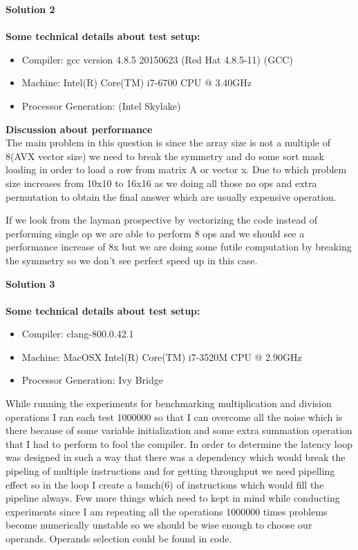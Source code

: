 \documentclass[letterpaper, 11pt]{article}
\begin{document}
\textbf{Solution 2}\\ \\
\textbf{Some technical details about test setup:}
\begin{itemize}
\item Compiler: gcc version 4.8.5 20150623 (Red Hat 4.8.5-11) (GCC) 
\item Machine:  Intel(R) Core(TM) i7-6700 CPU @ 3.40GHz
\item Processor Generation: (Intel Skylake)
\end{itemize}
\textbf{Discussion about performance}\\
The main problem in this question is since the array size is not a multiple of 8(AVX vector size) we need to break the symmetry and do some sort mask loading in order to load a row from matrix A or vector x. Due to which problem size increases from 10x10 to 16x16 as we doing all those no ops and extra permutation to obtain the final answer which are usually expensive operation.

If we look from the layman prospective by vectorizing the code instead of performing single op we are able to perform 8 ops and we should see a performance increase of 8x but we are doing some futile computation by breaking the symmetry so we don't see perfect speed up in this case.
\bigskip

\textbf{Solution 3}\\ \\
\textbf{Some technical details about test setup:} 
\begin{itemize}
\item Compiler: clang-800.0.42.1
\item Machine: MacOSX Intel(R) Core(TM) i7-3520M CPU @ 2.90GHz
\item Processor Generation: Ivy Bridge
\end{itemize}
While running the experiments for benchmarking multiplication and division operations I ran each test 1000000 so that I can overcome all the noise which is there because of some variable initialization and some extra summation operation that I had to perform to fool the compiler. In order to determine the latency loop was designed in such a way that there was a dependency which would break the pipeling of multiple instructions and for getting throughput we need pipelling effect so in the loop I create a bunch(6) of instructions which would fill the pipeline always. Few more things which need to kept in mind while conducting experiments since I am repeating all the operations 1000000 times problems become numerically unstable so we should be wise enough to choose our operands. Operands selection could be found in code.
\end{document}
